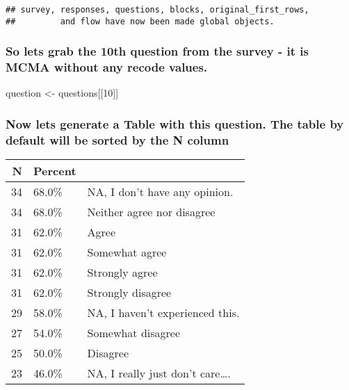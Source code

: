 \documentclass[
]{article}
\newenvironment{Shaded}{\begin{snugshade}}{\end{snugshade}}
\newcommand{\CommentTok}[1]{\textcolor[rgb]{0.56,0.35,0.01}{\textit{#1}}}
\newcommand{\DecValTok}[1]{\textcolor[rgb]{0.00,0.00,0.81}{#1}}
\newcommand{\KeywordTok}[1]{\textcolor[rgb]{0.13,0.29,0.53}{\textbf{#1}}}
\newcommand{\NormalTok}[1]{#1}
\newcommand{\OperatorTok}[1]{\textcolor[rgb]{0.81,0.36,0.00}{\textbf{#1}}}
\newcommand{\StringTok}[1]{\textcolor[rgb]{0.31,0.60,0.02}{#1}}
\begin{document}
\begin{verbatim}
## survey, responses, questions, blocks, original_first_rows,
##         and flow have now been made global objects.
\end{verbatim}

\hypertarget{so-lets-grab-the-10th-question-from-the-survey---it-is-mcma-without-any-recode-values.}{%
\subsubsection{So lets grab the 10th question from the survey - it is
MCMA without any recode
values.}\label{so-lets-grab-the-10th-question-from-the-survey---it-is-mcma-without-any-recode-values.}}

\begin{Shaded}
\begin{Highlighting}[]
\NormalTok{question \textless{}{-}}\StringTok{ }\NormalTok{questions[[}\DecValTok{10}\NormalTok{]]}
\end{Highlighting}
\end{Shaded}

\hypertarget{now-lets-generate-a-table-with-this-question.-the-table-by-default-will-be-sorted-by-the-n-column}{%
\subsubsection{Now lets generate a Table with this question. The table
by default will be sorted by the N
column}\label{now-lets-generate-a-table-with-this-question.-the-table-by-default-will-be-sorted-by-the-n-column}}

\begin{Shaded}
\end{Shaded}

\begin{longtable}[]{@{}rll@{}}
\toprule
N & Percent &\tabularnewline
\midrule
\endhead
34 & 68.0\% & NA, I don't have any opinion.\tabularnewline
34 & 68.0\% & Neither agree nor disagree\tabularnewline
31 & 62.0\% & Agree\tabularnewline
31 & 62.0\% & Somewhat agree\tabularnewline
31 & 62.0\% & Strongly agree\tabularnewline
31 & 62.0\% & Strongly disagree\tabularnewline
29 & 58.0\% & NA, I haven't experienced this.\tabularnewline
27 & 54.0\% & Somewhat disagree\tabularnewline
25 & 50.0\% & Disagree\tabularnewline
23 & 46.0\% & NA, I really just don't care\ldots.\tabularnewline
\bottomrule
\end{longtable}
\end{document}
